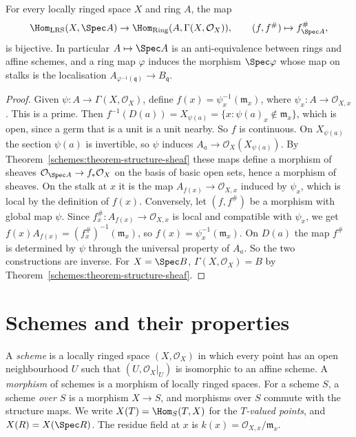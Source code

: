 \begin{theorem}\label{schemes:theorem-morphisms-to-affine}
For every locally ringed space $X$ and ring $A$, the map
\[
\Hom_{\mathrm{LRS}}(X, \Spec A) \to \Hom_{\mathrm{Ring}}(A, \Gamma(X, \mathcal{O}_X)), \qquad (f, f^\#) \mapsto f^\#_{\Spec A},
\]
is bijective. In particular $A \mapsto \Spec A$ is an anti-equivalence between rings and affine schemes, and a ring map $\varphi$ induces the
morphism $\Spec\varphi$ whose map on stalks is the localisation $A_{\varphi^{-1}(\mathfrak{q})} \to B_\mathfrak{q}$.
\end{theorem}

\begin{proof}
Given $\psi \colon A \to \Gamma(X, \mathcal{O}_X)$, define $f(x) = \psi_x^{-1}(\mathfrak{m}_x)$, where $\psi_x \colon A \to \mathcal{O}_{X,x}$. This is a prime. Then
$f^{-1}(D(a)) = X_{\psi(a)} = \{x : \psi(a)_x \notin \mathfrak{m}_x\}$, which is open, since a germ that is a unit is a unit nearby. So $f$ is continuous. On
$X_{\psi(a)}$ the section $\psi(a)$ is invertible, so $\psi$ induces $A_a \to \mathcal{O}_X(X_{\psi(a)})$. By Theorem~\ref{schemes:theorem-structure-sheaf}
these maps define a morphism of sheaves $\mathcal{O}_{\Spec A} \to f_*\mathcal{O}_X$ on the basis of basic open sets, hence a morphism of sheaves. On the stalk
at $x$ it is the map $A_{f(x)} \to \mathcal{O}_{X,x}$ induced by $\psi_x$, which is local by the definition of $f(x)$. Conversely, let $(f, f^\#)$ be a
morphism with global map $\psi$. Since $f^\#_x \colon A_{f(x)} \to \mathcal{O}_{X,x}$ is local and compatible with $\psi_x$, we get
$f(x)A_{f(x)} = (f^\#_x)^{-1}(\mathfrak{m}_x)$, so $f(x) = \psi_x^{-1}(\mathfrak{m}_x)$. On $D(a)$ the map $f^\#$ is determined by $\psi$ through the universal property
of $A_a$. So the two constructions are inverse. For $X = \Spec B$, $\Gamma(X, \mathcal{O}_X) = B$ by Theorem~\ref{schemes:theorem-structure-sheaf}.
\end{proof}

\section{Schemes and their properties}\label{schemes:section-schemes}

\begin{definition}\label{schemes:definition-scheme}
A \emph{scheme} is a locally ringed space $(X, \mathcal{O}_X)$ in which every point has an open neighbourhood $U$ such that $(U, \mathcal{O}_X|_U)$ is
isomorphic to an affine scheme. A \emph{morphism} of schemes is a morphism of locally ringed spaces. For a scheme $S$, a scheme \emph{over $S$} is a
morphism $X \to S$, and morphisms over $S$ commute with the structure maps. We write $X(T) = \Hom_S(T, X)$ for the \emph{$T$-valued points}, and
$X(R) = X(\Spec R)$. The residue field at $x$ is $k(x) = \mathcal{O}_{X,x}/\mathfrak{m}_x$.
\end{definition}

